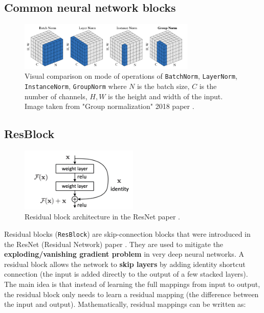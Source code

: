 \subsection{Common neural network blocks}
\label{appendix:blocks}


\begin{figure}
    \centering
    \includegraphics[width=0.75\textwidth]{images/appendix/blocks/norm.png}
    \caption{Visual comparison on mode of operations of \texttt{BatchNorm}, \texttt{LayerNorm}, \texttt{InstanceNorm}, \texttt{GroupNorm} where $N$ is the batch size, $C$ is the number of channels, $H,W$ is the height and width of the input. Image taken from "Group normalization" 2018 paper \cite{wu2018group}.}
    \label{fig:appendix_blocks_norm}
\end{figure}





\subsection*{ResBlock}

\begin{figure}
    \centering
    \includegraphics[width=0.5\textwidth]{images/appendix/blocks/resnet.png}
    \caption{Residual block architecture in the ResNet paper \cite{resnet}.}
    \label{fig:appendix_blocks_residual_block}
\end{figure}

Residual blocks (\texttt{ResBlock}) are skip-connection blocks that were introduced in the ResNet (Residual Network) paper \cite{resnet}. They are used to mitigate the \textbf{exploding/vanishing gradient problem} in very deep neural networks. A residual block allows the network to \textbf{skip layers} by adding identity shortcut connection (the input is added directly to the output of a few stacked layers). The main idea is that instead of learning the full mappings from input to output, the residual block only needs to learn a residual mapping (the difference between the input and output). Mathematically, residual mappings can be written as:

